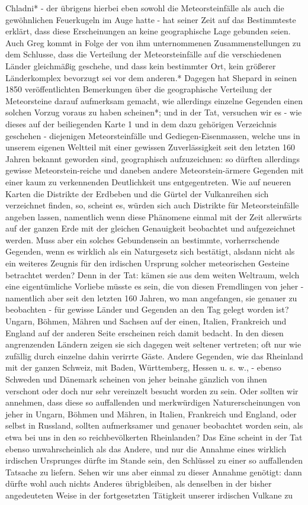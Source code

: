 \documentclass[a4paper, 11pt, oneside, polutonikogreek, german]{article}
\begin{document}
Chladni* - der übrigens hierbei eben sowohl die Meteorsteinfälle als auch die gewöhnlichen Feuerkugeln im Auge hatte - hat seiner Zeit auf das Bestimmteste erklärt, dass diese Erscheinungen an keine geographische Lage gebunden seien. Auch Greg kommt in Folge der von ihm unternommenen Zusammenstellungen zu dem Schlusse, dass die Verteilung der Meteorsteinfälle auf die verschiedenen Länder gleichmäßig geschehe, und dass kein bestimmter Ort, kein größerer Länderkomplex bevorzugt sei vor dem anderen.* Dagegen hat Shepard in seinen 1850 veröffentlichten Bemerkungen über die geographische Verteilung der Meteorsteine darauf aufmerksam gemacht, wie allerdings einzelne Gegenden einen solchen Vorzug voraus zu haben scheinen*; und in der Tat, versuchen wir es - wie dieses auf der beiliegenden Karte 1 und in dem dazu gehörigen Verzeichnis geschehen - diejenigen Meteorsteinfälle und Gediegen-Eisenmassen, welche uns in unserem eigenen Weltteil mit einer gewissen Zuverlässigkeit seit den letzten 160 Jahren bekannt geworden sind, geographisch aufzuzeichnen: so dürften allerdings gewisse Meteorstein-reiche und daneben andere Meteorstein-ärmere Gegenden mit einer kaum zu verkennenden Deutlichkeit uns entgegentreten. Wie auf neueren Karten die Distrikte der Erdbeben und die Gürtel der Vulkanreihen sich verzeichnet finden, so, scheint es, würden sich auch Distrikte für Meteorsteinfälle angeben lassen, namentlich wenn diese Phänomene einmal mit der Zeit allerwärts auf der ganzen Erde mit der gleichen Genauigkeit beobachtet und aufgezeichnet werden. Muss aber ein solches Gebundensein an bestimmte, vorherrschende Gegenden, wenn es wirklich als ein Naturgesetz sich bestätigt, alsdann nicht als ein weiteres Zeugnis für den irdischen Ursprung solcher meteorischen Gesteine betrachtet werden? Denn in der Tat: kämen sie aus dem weiten Weltraum, welch eine eigentümliche Vorliebe müsste es sein, die von diesen Fremdlingen von jeher - namentlich aber seit den letzten 160 Jahren, wo man angefangen, sie genauer zu beobachten - für gewisse Länder und Gegenden an den Tag gelegt worden ist? Ungarn, Böhmen, Mähren und Sachsen auf der einen, Italien, Frankreich und England auf der anderen Seite erscheinen reich damit bedacht. In den diesen angrenzenden Ländern zeigen sie sich dagegen weit seltener vertreten; oft nur wie zufällig durch einzelne dahin verirrte Gäste. Andere Gegenden, wie das Rheinland mit der ganzen Schweiz, mit Baden, Württemberg, Hessen u. s. w., - ebenso Schweden und Dänemark scheinen von jeher beinahe gänzlich von ihnen verschont oder doch nur sehr vereinzelt besucht worden zu sein. Oder sollten wir annehmen, dass diese so auffallenden und merkwürdigen Naturerscheinungen von jeher in Ungarn, Böhmen und Mähren, in Italien, Frankreich und England, oder selbst in Russland, sollten aufmerksamer und genauer beobachtet worden sein, als etwa bei uns in den so reichbevölkerten Rheinlanden? Das Eine scheint in der Tat ebenso unwahrscheinlich als das Andere, und nur die Annahme eines wirklich irdischen Ursprunges dürfte im Stande sein, den Schlüssel zu einer so auffallenden Tatsache zu liefern. Sehen wir uns aber einmal zu dieser Annahme genötigt: dann dürfte wohl auch nichts Anderes übrigbleiben, als denselben in der bisher angedeuteten Weise in der fortgesetzten Tätigkeit unserer irdischen Vulkane zu 
\end{document}

